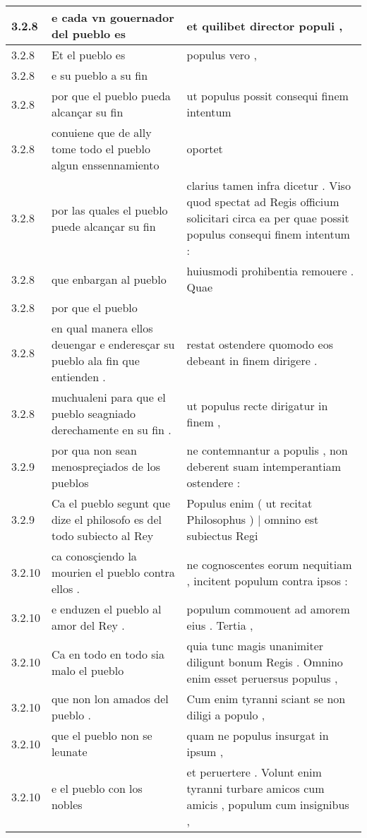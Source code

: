 \begin{tabular}{|p{1cm}|p{6.5cm}|p{6.5cm}|}
3.2.8 & e cada vn gouernador del pueblo es & et quilibet director populi , \\\hline
3.2.8 & Et el pueblo es & populus vero , \\\hline
3.2.8 & e su pueblo a su fin &  \\\hline
3.2.8 & por que el pueblo pueda alcançar su fin & ut populus possit consequi finem intentum \\\hline
3.2.8 & conuiene que de ally tome todo el pueblo algun enssennamiento & oportet \\\hline
3.2.8 & por las quales el pueblo puede alcançar su fin & clarius tamen infra dicetur . Viso quod spectat ad Regis officium solicitari circa ea per quae possit populus consequi finem intentum : \\\hline
3.2.8 & que enbargan al pueblo & huiusmodi prohibentia remouere . Quae \\\hline
3.2.8 & por que el pueblo &  \\\hline
3.2.8 & en qual manera ellos deuengar e enderesçar su pueblo ala fin que entienden . & restat ostendere quomodo eos debeant in finem dirigere . \\\hline
3.2.8 & muchualeni para que el pueblo seagniado derechamente en su fin . & ut populus recte dirigatur in finem , \\\hline
3.2.9 & por qua non sean menospreçiados de los pueblos & ne contemnantur a populis , non deberent suam intemperantiam ostendere : \\\hline
3.2.9 & Ca el pueblo segunt que dize el philosofo es del todo subiecto al Rey & Populus enim ( ut recitat Philosophus ) | omnino est subiectus Regi \\\hline
3.2.10 & ca conosçiendo la mourien el pueblo contra ellos . & ne cognoscentes eorum nequitiam , incitent populum contra ipsos : \\\hline
3.2.10 & e enduzen el pueblo al amor del Rey . & populum commouent ad amorem eius . Tertia , \\\hline
3.2.10 & Ca en todo en todo sia malo el pueblo & quia tunc magis unanimiter diligunt bonum Regis . Omnino enim esset peruersus populus , \\\hline
3.2.10 & que non lon amados del pueblo . & Cum enim tyranni sciant se non diligi a populo , \\\hline
3.2.10 & que el pueblo non se leunate & quam ne populus insurgat in ipsum , \\\hline
3.2.10 & e el pueblo con los nobles & et peruertere . Volunt enim tyranni turbare amicos cum amicis , populum cum insignibus , \\\hline

\end{tabular}
